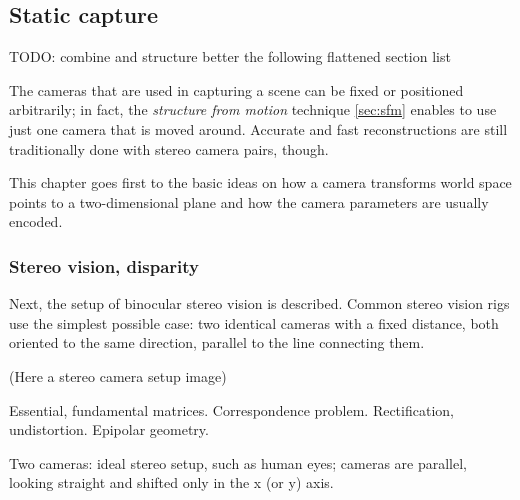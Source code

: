 \subsection{Static capture}

TODO: combine and structure better the following flattened section list

The cameras that are used in capturing a scene can be fixed or positioned arbitrarily; in fact, the \textit{structure from motion} technique \ref{sec:sfm} enables to use just one camera that is moved around. Accurate and fast reconstructions are still traditionally done with stereo camera pairs, though.

This chapter goes first to the basic ideas on how a camera transforms world space points to a two-dimensional plane and how the camera parameters are usually encoded.


\subsubsection{Stereo vision, disparity}

Next, the setup of binocular stereo vision is described. Common stereo vision rigs use the simplest possible case: two identical cameras with a fixed distance, both oriented to the same direction, parallel to the line connecting them.

(Here a stereo camera setup image)

Essential, fundamental matrices. Correspondence problem. Rectification, undistortion. Epipolar geometry.

Two cameras: ideal stereo setup, such as human eyes; cameras are parallel, looking straight and shifted only in the x (or y) axis.

